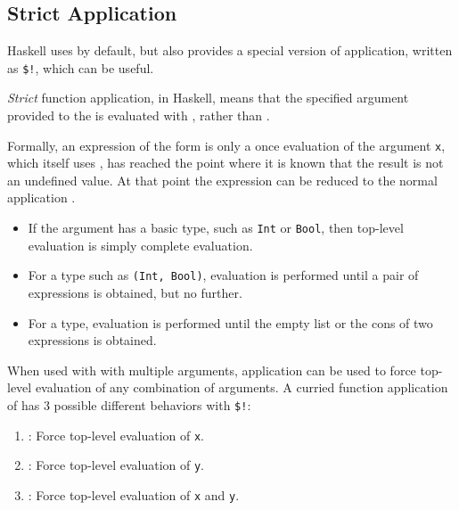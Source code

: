 \subsection{Strict Application}\label{subsec:Strict_Application}
Haskell uses  by default, but also provides a special  version of  application, written as \texttt{\$!}, which can be useful.

\begin{definition}[Strict]\label{def:Strict}
  \emph{Strict} function application, in Haskell, means that the specified argument provided to the  is evaluated with , rather than .

  Formally, an expression of the form  is only a  once evaluation of the argument \texttt{x}, which itself uses , has reached the point where it is known that the result is not an undefined value.
  At that point the expression can be reduced to the normal application .
\end{definition}

\begin{itemize}[noitemsep]
\item If the argument has a basic type, such as \texttt{Int} or \texttt{Bool}, then top-level evaluation is simply complete evaluation.
\item For a  type such as \texttt{(Int, Bool)}, evaluation is performed until a pair of expressions is obtained, but no further.
\item For a  type, evaluation is performed until the empty list or the cons of two expressions is obtained.
\end{itemize}

When used with  with multiple arguments,  application can be used to force top-level evaluation of any combination of arguments.
A curried function application of  has 3 possible different behaviors with \texttt{\$!}:
\begin{enumerate}[noitemsep]
\item {}: Force top-level evaluation of \texttt{x}.
\item {}: Force top-level evaluation of \texttt{y}.
\item {}: Force top-level evaluation of \texttt{x} and \texttt{y}.
\end{enumerate}

